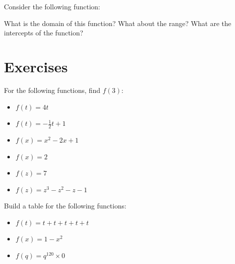 \newpage
\begin{prblm}

Consider the following function:
\begin{center}
\end{center}

\noindent
What is the domain of this function? What about the range? What are the intercepts of the function?
\vspace{4cm}
\end{prblm}


\pagebreak


\section*{Exercises}

\begin{exercise}
For the following functions, find $f(3)$:

\begin{itemize}
\item $f(t) = 4t$
\item $f(t) = -\frac{1}{2}t + 1$
\item $f(x) = x^2 - 2x + 1$
\item $f(x) = 2$
\item $f(z) = 7$
\item $f(z) = z^3-z^2-z-1$
\end{itemize}

\end{exercise}
\bigskip

\begin{exercise}
Build a table for the following functions:

\begin{itemize}
\item $f(t) = t + t + t + t + t$
\item $f(x) = 1-x^{2}$
\item $f(q) = q^{120}\times 0$
\end{itemize}

\end{exercise}
\bigskip

